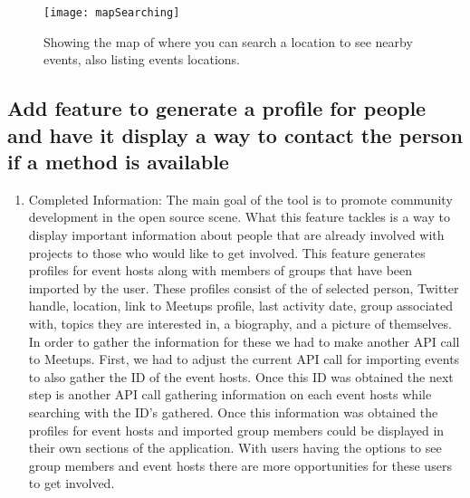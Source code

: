 \documentclass[draftclsnofoot,10pt,onecolumn]{IEEEtran} %
\begin{document}
\begin{figure}[H]
  \begin{center}
  
  \texttt{[image: mapSearching]}
  \captionsetup{width=.4\linewidth}
  \centering
  \caption{Showing the map of where you can search a location to see nearby events, also listing events locations. }

  \end{center}
\end{figure}

\subsection{Add feature to generate a profile for people and have it display a way to contact the person if a method is available}
\begin{enumerate}[label*=\arabic*.]

  \item Completed Information: The main goal of the tool is to promote community
    development in the open source scene. What this feature tackles is a way to display
    important information about people that are already involved with projects to those
    who would like to get involved. This feature generates profiles for event hosts along
    with members of groups that have been imported by the user. These profiles consist of 
    the of selected person, Twitter handle, location, link to Meetups profile, last activity date, 
    group associated with, topics they are interested in, a biography, and a picture of themselves.
    In order to gather the information for these we had to make another API call to Meetups. First,
    we had to adjust the current API call for importing events to also gather the ID of the event hosts.
    Once this ID was obtained the next step is another API call gathering information on each event hosts
    while searching with the ID's gathered. Once this information was obtained the profiles for event
    hosts and imported group members could be displayed in their own sections of the application.
    With users having the options to see group members and event hosts there are more opportunities
    for these users to get involved.

\end{enumerate}
\end{document}
